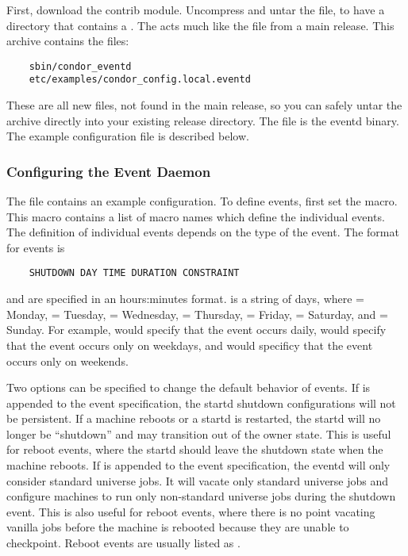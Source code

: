 First, download the  contrib module.
Uncompress and untar the file, to have a directory that
contains a .
The  acts much like the  file from
a main release.
This archive contains the files:
\begin{verbatim}
	sbin/condor_eventd
	etc/examples/condor_config.local.eventd
\end{verbatim}
These are all new files, not found in the main release, so you can
safely untar the archive directly into your existing release
directory.
The file  is the eventd binary.
The example configuration file is described below.

\subsubsection{\label{sec:EventD-Configuration}
Configuring the Event Daemon} 

The file  contains an
example configuration.
To define events, first set the  macro.
This macro contains a list of macro names which define the individual
events.
The definition of individual events depends on the type of the event.
The format for  events is
\begin{verbatim}
	SHUTDOWN DAY TIME DURATION CONSTRAINT
\end{verbatim}
\verb@TIME@ and \verb@DURATION@ are specified in an hours:minutes
format.  \verb@DAY@ is a string of days, where \verb@M@ = Monday,
\verb@T@ = Tuesday, \verb@W@ = Wednesday, \verb@R@ = Thursday,
\verb@F@ = Friday, \verb@S@ = Saturday, and \verb@U@ = Sunday.  For
example, \verb@MTWRFSU@ would specify that the event occurs daily,
\verb@MTWRF@ would specify that the event occurs only on weekdays, and
\verb@SU@ would specificy that the event occurs only on weekends.

Two options can be specified to change the default behavior of
 events.
If  is appended to the  event
specification, the startd shutdown configurations will not be
persistent.  If a machine reboots or a startd is restarted, the startd
will no longer be ``shutdown'' and may transition out of the owner state.
This is useful for reboot events, where the startd should leave the
shutdown state when the machine reboots.
If  is appended to the  event
specification, the eventd will only consider standard universe jobs.
It will vacate only standard universe jobs and configure machines to
run only non-standard universe jobs during the shutdown event.
This is also useful for reboot events, where there is no point
vacating vanilla jobs before the machine is rebooted because
they are unable to checkpoint.
Reboot events are usually listed as .

